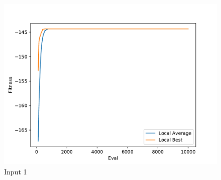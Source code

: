 \documentclass{standalone}
\begin{document}
\begin{figure}[!htb]
	\caption{Input 1}
	\label{fig:graph_1043}
	\includegraphics[width=\textwidth]{../graphs/graphs/1043.pdf}
\end{figure}
\end{document}
